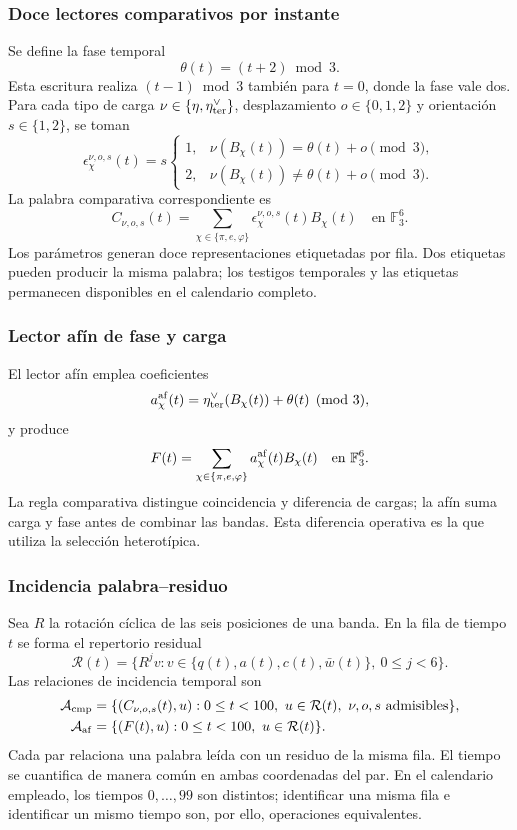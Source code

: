 \subsubsection{Doce lectores comparativos por instante}

Se define la fase temporal
\[
 \theta(t)=(t+2)\bmod3.
\]
Esta escritura realiza $(t-1)\bmod3$ también para $t=0$, donde la fase
vale dos. Para cada tipo de carga
$\nu\in\{\eta,\eta_{\rm ter}^\vee\}$, desplazamiento
$o\in\{0,1,2\}$ y orientación $s\in\{1,2\}$, se toman
\[
 \epsilon_\chi^{\nu,o,s}(t)=s
 \begin{cases}
 1,&\nu(B_\chi(t))=\theta(t)+o\pmod3,\\
 2,&\nu(B_\chi(t))\ne\theta(t)+o\pmod3.
 \end{cases}
\]
La palabra comparativa correspondiente es
\begin{equation}
 C_{\nu,o,s}(t)=
 \sum_{\chi\in\{\pi,e,\varphi\}}
 \epsilon_\chi^{\nu,o,s}(t)B_\chi(t)
 \quad\text{en }\mathbb F_3^6.
 \label{act21:eq:kdes-comparativo}
\end{equation}
Los parámetros generan doce representaciones etiquetadas por fila. Dos
etiquetas pueden producir la misma palabra; los testigos temporales y
las etiquetas permanecen disponibles en el calendario completo.

\subsubsection{Lector afín de fase y carga}

El lector afín emplea coeficientes
\[
 a_\chi^{\rm af}(t)=\eta_{\rm ter}^\vee(B_\chi(t))+\theta(t)
 \pmod3,
\]
y produce
\begin{equation}
 F(t)=\sum_{\chi\in\{\pi,e,\varphi\}}
 a_\chi^{\rm af}(t)B_\chi(t)
 \quad\text{en }\mathbb F_3^6.
 \label{act21:eq:kdes-afin}
\end{equation}
La regla comparativa distingue coincidencia y diferencia de cargas;
la afín suma carga y fase antes de combinar las bandas. Esta diferencia
operativa es la que utiliza la selección heterotípica.

\subsubsection{Incidencia palabra--residuo}

Sea $R$ la rotación cíclica de las seis posiciones de una banda. En la
fila de tiempo $t$ se forma el repertorio residual
\[
 \mathcal R(t)=\{R^jv:
      v\in\{q(t),a(t),c(t),\bar w(t)\},\ 0\leq j<6\}.
\]
Las relaciones de incidencia temporal son
\begin{align}
 \mathcal A_{\rm cmp}
 &=\{(C_{\nu,o,s}(t),u):
      0\leq t<100,\ u\in\mathcal R(t),\ \nu,o,s\text{ admisibles}\},\\
 \mathcal A_{\rm af}
 &=\{(F(t),u):0\leq t<100,\ u\in\mathcal R(t)\}.
 \label{act21:eq:kdes-atlas}
\end{align}
Cada par relaciona una palabra leída con un residuo de la misma fila.
El tiempo se cuantifica de manera común en ambas coordenadas del par.
En el calendario empleado, los tiempos $0,\ldots,99$ son distintos;
identificar una misma fila e identificar un mismo tiempo son, por ello,
operaciones equivalentes.

